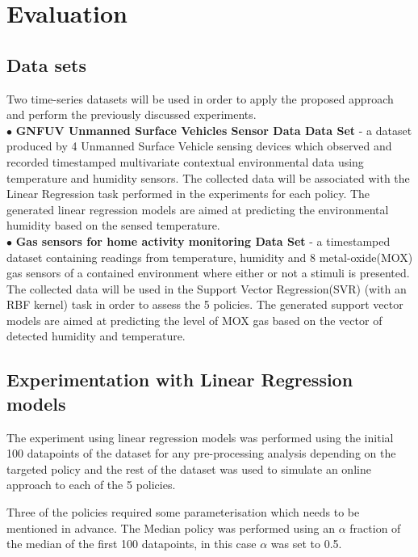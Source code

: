 \documentclass{mpaper}
\begin{document}
\section{Evaluation}

\subsection*{Data sets}
Two time-series datasets will be used in order to apply the proposed approach and perform the previously discussed experiments.
\\$\bullet$ \textbf{GNFUV Unmanned Surface Vehicles Sensor Data Data Set} \cite{harth2018} - a dataset produced by 4 Unmanned Surface Vehicle sensing devices which observed and recorded timestamped multivariate contextual environmental data using temperature and humidity sensors. The collected data will be associated with the Linear Regression task performed in the experiments for each policy. The generated linear regression models are aimed at predicting the environmental humidity based on the sensed temperature.
\\$\bullet$ \textbf{Gas sensors for home activity monitoring Data Set } \cite{HUERTA2016169} - a timestamped dataset containing readings from temperature, humidity and 8 metal-oxide(MOX) gas sensors of a contained environment where either or not a stimuli is presented. The collected data will be used in the Support Vector Regression(SVR) (with an RBF kernel) task in order to assess the 5 policies. The generated support vector models are aimed at predicting the level of MOX gas based on the vector of detected humidity and temperature.
\subsection{Experimentation with Linear Regression models}
The experiment using linear regression models was performed using the initial 100 datapoints of the dataset for any pre-processing analysis depending on the targeted policy and the rest of the dataset was used to simulate an online approach to each of the 5 policies.

Three of the policies required some parameterisation which needs to be mentioned in advance.
The Median policy was performed using an $\alpha$ fraction of the median of the first 100 datapoints, in this case $\alpha$ was set to 0.5.
\end{document}
